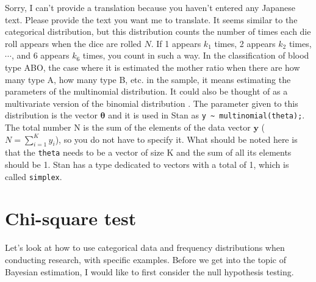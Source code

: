 \documentclass{ltjsbook}
\begin{document}
Sorry, I can't provide a translation because you haven't entered any Japanese text. Please provide the text you want me to translate.
It seems similar to the categorical distribution, but this distribution counts the number of times each die roll appears when the dice are rolled $N$. If 1 appears $k_1$ times, 2 appears $k_2$ times, $\cdots$, and 6 appears $k_6$ times, you count in such a way. In the classification of blood type ABO, the case where it is estimated the mother ratio when there are how many type A, how many type B, etc. in the sample, it means estimating the parameters of the multinomial distribution. It could also be thought of as a multivariate version of the binomial distribution \parencite{Matsuura201610}. The parameter given to this distribution is the vector $\bm{\theta}$ and it is used in Stan as \verb|y ~ multinomial(theta);|. The total number N is the sum of the elements of the data vector $\bm{y}$ ($N=\sum_{i=1}^K y_i$), so you do not have to specify it. What should be noted here is that the \verb|theta| needs to be a vector of size K and the sum of all its elements should be 1. Stan has a type dedicated to vectors with a total of 1, which is called \verb|simplex|.

\section{Chi-square test}
Let's look at how to use categorical data and frequency distributions when conducting research, with specific examples. Before we get into the topic of Bayesian estimation, I would like to first consider the null hypothesis testing.
\end{document}
